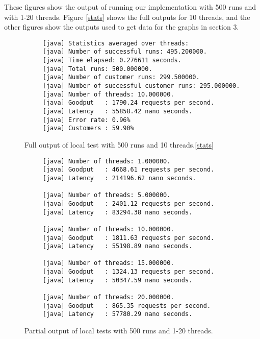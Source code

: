 These figures show the output of running our implementation with 500 runs and with 1-20 threads. Figure \ref{stats} shows the full outputs for 10 threads, and the other figures show the outputs used to get data for the graphs in section 3.

\begin{figure}[h!]
\begin{verbatim}
     [java] Statistics averaged over threads:
     [java] Number of successful runs: 495.200000.
     [java] Time elapsed: 0.276611 seconds.
     [java] Total runs: 500.000000.
     [java] Number of customer runs: 299.500000.
     [java] Number of successful customer runs: 295.000000.
     [java] Number of threads: 10.000000.
     [java] Goodput   : 1790.24 requests per second.
     [java] Latency   : 55858.42 nano seconds.
     [java] Error rate: 0.96%
     [java] Customers : 59.90%
\end{verbatim}
\caption{Full output of local test with 500 runs and 10 threads.\ref{stats}}
\end{figure}

\begin{figure}[h!]
\begin{verbatim}
     [java] Number of threads: 1.000000.
     [java] Goodput   : 4668.61 requests per second.
     [java] Latency   : 214196.62 nano seconds.

     [java] Number of threads: 5.000000.
     [java] Goodput   : 2401.12 requests per second.
     [java] Latency   : 83294.38 nano seconds.

     [java] Number of threads: 10.000000.
     [java] Goodput   : 1811.63 requests per second.
     [java] Latency   : 55198.89 nano seconds.

     [java] Number of threads: 15.000000.
     [java] Goodput   : 1324.13 requests per second.
     [java] Latency   : 50347.59 nano seconds.

     [java] Number of threads: 20.000000.
     [java] Goodput   : 865.35 requests per second.
     [java] Latency   : 57780.29 nano seconds.
\end{verbatim}
\caption{Partial output of local tests with 500 runs and 1-20 threads.}
\end{figure}

